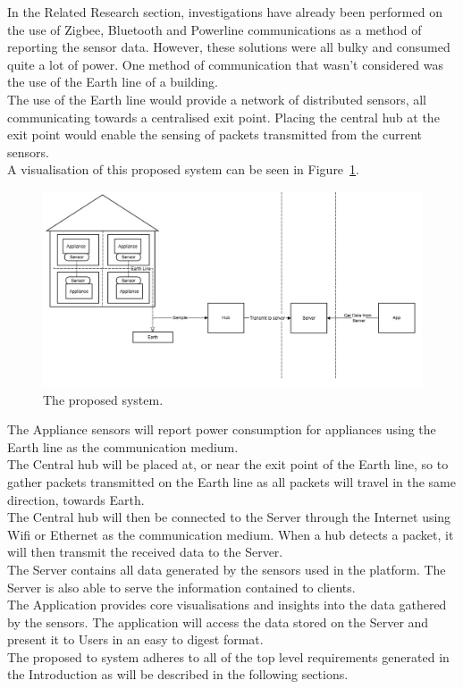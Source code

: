 \documentclass[preprint,12pt,3p]{elsarticle}
\begin{document}
In the Related Research section, investigations have already been performed on the use of Zigbee, Bluetooth and Powerline communications as a method of reporting the sensor data. However, these solutions were all bulky and consumed quite a lot of power. One method of communication that wasn't considered was the use of the Earth line of a building.\\
The use of the Earth line would provide a network of distributed sensors, all communicating towards a centralised exit point. Placing the central hub at the exit point would enable the sensing of packets transmitted from the current sensors.\\
A visualisation of this proposed system can be seen in Figure~\ref{fig:proposed}.
\begin{figure}[H]
    \centering
    \includegraphics[width=\columnwidth]{diagrams/overalldescript}
    \caption {The proposed system.}
    \label{fig:proposed}
\end{figure}
The Appliance sensors will report power consumption for appliances using the Earth line as the communication medium.\\
The Central hub will be placed at, or near the exit point of the Earth line, so to gather packets transmitted on the Earth line as all packets will travel in the same direction, towards Earth.\\
The Central hub will then be connected to the Server through the Internet using Wifi or Ethernet as the communication medium. When a hub detects a packet, it will then transmit the received data to the Server.\\
The Server contains all data generated by the sensors used in the platform. The Server is also able to serve the information contained to clients.\\
The Application provides core visualisations and insights into the data gathered by the sensors. The application will access the data stored on the Server and present it to Users in an easy to digest format.\\
The proposed to system adheres to all of the top level requirements generated in the Introduction as will be described in the following sections.
\end{document}
